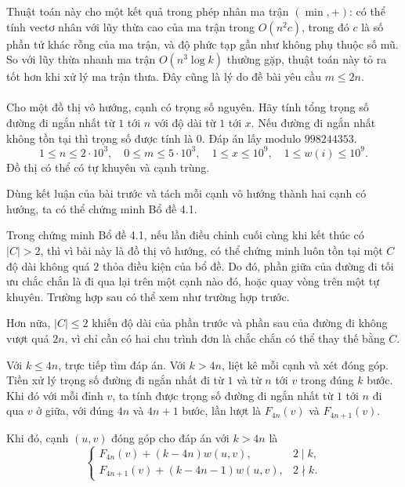 \documentclass[11pt]{article}
\begin{document}
Thuật toán này cho một kết quả trong phép nhân ma trận \((\min,+)\): có thể
tính vectơ nhân với lũy thừa cao của ma trận trong \(O(n^2c)\), trong đó \(c\)
là số phần tử khác rỗng của ma trận, và độ phức tạp gần như không phụ thuộc số
mũ. So với lũy thừa nhanh ma trận \(O(n^3\log k)\) thường gặp, thuật toán này
tỏ ra tốt hơn khi xử lý ma trận thưa. Đây cũng là lý do đề bài yêu cầu
\(m\le2n\).

\paragraph{}
Cho một đồ thị vô hướng, cạnh có trọng số nguyên. Hãy tính tổng trọng số đường
đi ngắn nhất từ \(1\) tới \(n\) với độ dài từ \(1\) tới \(x\). Nếu đường đi
ngắn nhất không tồn tại thì trọng số được tính là \(0\). Đáp án lấy modulo
\(998244353\).
\[
  1\le n\le2\cdot10^3,\quad
  0\le m\le5\cdot10^3,\quad
  1\le x\le10^9,\quad
  1\le w(i)\le10^9.
\]
Đồ thị có thể có tự khuyên và cạnh trùng.

Dùng kết luận của bài trước và tách mỗi cạnh vô hướng thành hai cạnh có hướng,
ta có thể chứng minh Bổ đề 4.1.

Trong chứng minh Bổ đề 4.1, nếu lần điều chỉnh cuối cùng khi kết thúc có
\(|C|>2\), thì vì bài này là đồ thị vô hướng, có thể chứng minh luôn tồn tại
một \(C\) độ dài không quá \(2\) thỏa điều kiện của bổ đề. Do đó, phần giữa của
đường đi tối ưu chắc chắn là đi qua lại trên một cạnh nào đó, hoặc quay vòng
trên một tự khuyên. Trường hợp sau có thể xem như trường hợp trước.

Hơn nữa, \(|C|\le2\) khiến độ dài của phần trước và phần sau của đường đi
không vượt quá \(2n\), vì chỉ cần có hai chu trình đơn là chắc chắn có thể thay
thế bằng \(C\).

Với \(k\le4n\), trực tiếp tìm đáp án. Với \(k>4n\), liệt kê mỗi cạnh và xét
đóng góp. Tiền xử lý trọng số đường đi ngắn nhất đi từ \(1\) và từ \(n\) tới
\(v\) trong đúng \(k\) bước. Khi đó với mỗi đỉnh \(v\), ta tính được trọng số
đường đi ngắn nhất từ \(1\) tới \(n\) đi qua \(v\) ở giữa, với đúng \(4n\) và
\(4n+1\) bước, lần lượt là \(F_{4n}(v)\) và \(F_{4n+1}(v)\).

Khi đó, cạnh \((u,v)\) đóng góp cho đáp án với \(k>4n\) là
\[
  \begin{cases}
  F_{4n}(v)+(k-4n)w(u,v), & 2\mid k,\\
  F_{4n+1}(v)+(k-4n-1)w(u,v), & 2\nmid k.
  \end{cases}
\]
\end{document}

